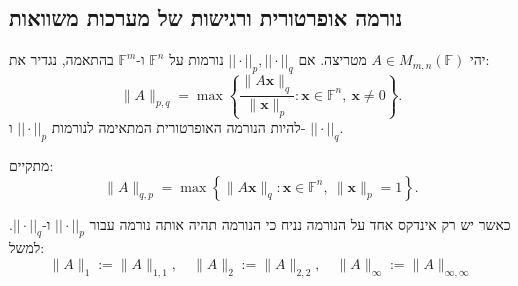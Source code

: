 \documentclass{tstextbook}
\begin{document}
\subsection{נורמה אופרטורית ורגישות של מערכות משוואות}

\begin{definition}
יהי \(A \in M_{m,n}\left( \mathbb{F}  \right)\) מטריצה. אם \(||\cdot||_{p},||\cdot||_{q}\) נורמות על \(\mathbb{F} ^{n}\) ו-\(\mathbb{F} ^{m}\) בהתאמה, נגדיר את:
$$\|A\|_{p,q}=\operatorname*{max}\left\{{\frac{\|A\mathbf{x}\|_{q}}{\|\mathbf{x}\|_{p}}}:\mathbf{x}\in\mathbb{F}^{n},\ \mathbf{x}\neq0\right\}.$$
להיות הנורמה האופרטורית המתאימה לנורמות \(||\cdot||_{p}\) ו- \(||\cdot||_{q}\).

\end{definition}
\begin{proposition}
מתקיים:
$$\|A\|_{q,p}=\operatorname*{max}\left\{\|A\mathbf{x}\|_{q}:\mathbf{x}\in\mathbb{F}^{n},\ \|\mathbf{x}\|_{p}=1\right\}.$$

\end{proposition}
\begin{symbolize}
כאשר יש רק אינדקס אחד על הנורמה נניח כי הנורמה תהיה אותה נורמה עבור \(||\cdot||_{p}\) ו-\(||\cdot||_{q}\). למשל:
$$\|A\|_{1}:=\|A\|_{1,1},\quad\|A\|_{2}:=\|A\|_{2,2},\quad\|A\|_{\infty}:=\|A\|_{\infty,\infty}$$

\end{symbolize}
\end{document}
